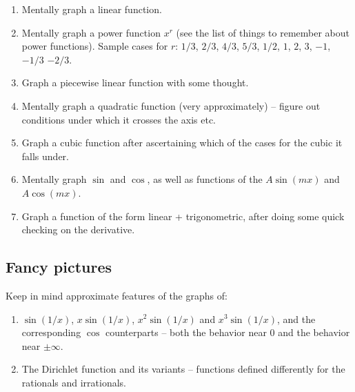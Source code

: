\documentclass[10pt]{amsart}
\begin{document}
\begin{enumerate}
\item Mentally graph a linear function.
\item Mentally graph a power function $x^r$ (see the list of things to
  remember about power functions). Sample cases for $r$: $1/3$, $2/3$,
  $4/3$, $5/3$, $1/2$, $1$, $2$, $3$, $-1$, $-1/3$ $-2/3$.
\item Graph a piecewise linear function with some thought.
\item Mentally graph a quadratic function (very approximately) --
  figure out conditions under which it crosses the axis etc.
\item Graph a cubic function after ascertaining which of the cases for
  the cubic it falls under.
\item Mentally graph $\sin$ and $\cos$, as well as functions of the $A
  \sin(mx)$ and $A\cos(mx)$.
\item Graph a function of the form linear + trigonometric, after doing
  some quick checking on the derivative.
\end{enumerate}

\subsection{Fancy pictures}

Keep in mind approximate features of the graphs of:

\begin{enumerate}
\item $\sin(1/x)$, $x\sin(1/x)$, $x^2 \sin(1/x)$ and $x^3\sin(1/x)$,
  and the corresponding $\cos$ counterparts -- both the behavior near
  $0$ and the behavior near $\pm \infty$.
\item The Dirichlet function and its variants -- functions defined
  differently for the rationals and irrationals.
\end{enumerate}
\end{document}
